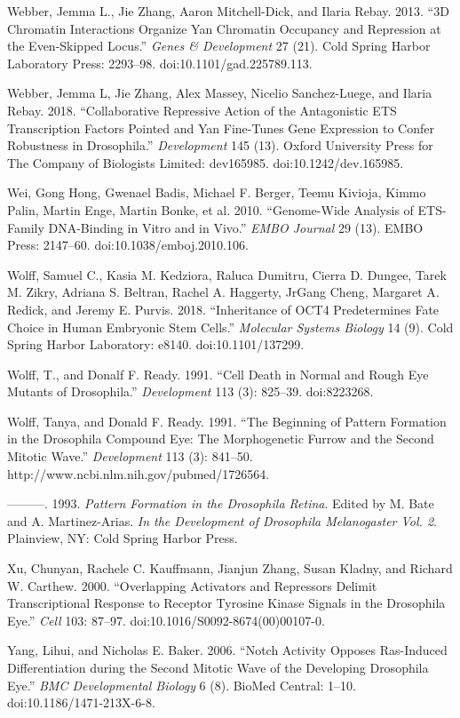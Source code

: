 Webber, Jemma L., Jie Zhang, Aaron Mitchell-Dick, and Ilaria Rebay. 2013. ``3D Chromatin Interactions Organize Yan Chromatin Occupancy and Repression at the Even-Skipped Locus.'' \emph{Genes \& Development} 27 (21). Cold Spring Harbor Laboratory Press: 2293--98. doi:10.1101/gad.225789.113.

Webber, Jemma L, Jie Zhang, Alex Massey, Nicelio Sanchez-Luege, and Ilaria Rebay. 2018. ``Collaborative Repressive Action of the Antagonistic ETS Transcription Factors Pointed and Yan Fine-Tunes Gene Expression to Confer Robustness in Drosophila.'' \emph{Development} 145 (13). Oxford University Press for The Company of Biologists Limited: dev165985. doi:10.1242/dev.165985.

Wei, Gong Hong, Gwenael Badis, Michael F. Berger, Teemu Kivioja, Kimmo Palin, Martin Enge, Martin Bonke, et al. 2010. ``Genome-Wide Analysis of ETS-Family DNA-Binding in Vitro and in Vivo.'' \emph{EMBO Journal} 29 (13). EMBO Press: 2147--60. doi:10.1038/emboj.2010.106.

Wolff, Samuel C., Kasia M. Kedziora, Raluca Dumitru, Cierra D. Dungee, Tarek M. Zikry, Adriana S. Beltran, Rachel A. Haggerty, JrGang Cheng, Margaret A. Redick, and Jeremy E. Purvis. 2018. ``Inheritance of OCT4 Predetermines Fate Choice in Human Embryonic Stem Cells.'' \emph{Molecular Systems Biology} 14 (9). Cold Spring Harbor Laboratory: e8140. doi:10.1101/137299.

Wolff, T., and Donalf F. Ready. 1991. ``Cell Death in Normal and Rough Eye Mutants of Drosophila.'' \emph{Development} 113 (3): 825--39. doi:8223268.

Wolff, Tanya, and Donald F. Ready. 1991. ``The Beginning of Pattern Formation in the Drosophila Compound Eye: The Morphogenetic Furrow and the Second Mitotic Wave.'' \emph{Development} 113 (3): 841--50. http://www.ncbi.nlm.nih.gov/pubmed/1726564.

---------. 1993. \emph{Pattern Formation in the Drosophila Retina}. Edited by M. Bate and A. Martinez-Arias. \emph{In the Development of Drosophila Melanogaster Vol. 2}. Plainview, NY: Cold Spring Harbor Press.

Xu, Chunyan, Rachele C. Kauffmann, Jianjun Zhang, Susan Kladny, and Richard W. Carthew. 2000. ``Overlapping Activators and Repressors Delimit Transcriptional Response to Receptor Tyrosine Kinase Signals in the Drosophila Eye.'' \emph{Cell} 103: 87--97. doi:10.1016/S0092-8674(00)00107-0.

Yang, Lihui, and Nicholas E. Baker. 2006. ``Notch Activity Opposes Ras-Induced Differentiation during the Second Mitotic Wave of the Developing Drosophila Eye.'' \emph{BMC Developmental Biology} 6 (8). BioMed Central: 1--10. doi:10.1186/1471-213X-6-8.

